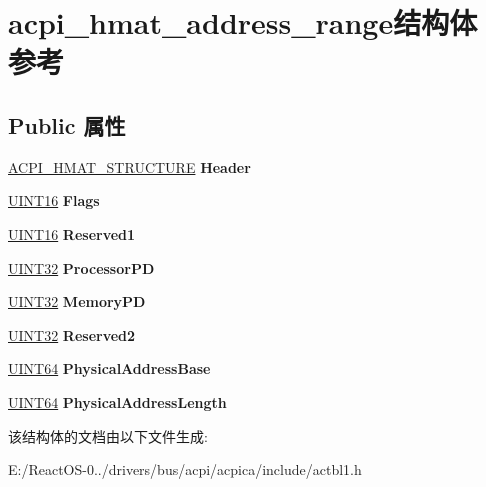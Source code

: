 \hypertarget{structacpi__hmat__address__range}{}\section{acpi\+\_\+hmat\+\_\+address\+\_\+range结构体 参考}
\label{structacpi__hmat__address__range}
\subsection*{Public 属性}
\begin{DoxyCompactItemize}
\item 
\mbox{\label{structacpi__hmat__address__range_ade450cdb46aeb62cbd66ee703dfc2ee3}} 
\hyperlink{structacpi__hmat__structure}{A\+C\+P\+I\+\_\+\+H\+M\+A\+T\+\_\+\+S\+T\+R\+U\+C\+T\+U\+RE} {\bfseries Header}
\item 
\mbox{\label{structacpi__hmat__address__range_a38cce1bba5f9caa1f22ec282641f3fa7}} 
\hyperlink{_processor_bind_8h_a09f1a1fb2293e33483cc8d44aefb1eb1}{U\+I\+N\+T16} {\bfseries Flags}
\item 
\mbox{\label{structacpi__hmat__address__range_a13a26993b37912dc9bd79932957e7619}} 
\hyperlink{_processor_bind_8h_a09f1a1fb2293e33483cc8d44aefb1eb1}{U\+I\+N\+T16} {\bfseries Reserved1}
\item 
\mbox{\label{structacpi__hmat__address__range_a09f9fbdd298071986c94a6f06dd2c865}} 
\hyperlink{_processor_bind_8h_ae1e6edbbc26d6fbc71a90190d0266018}{U\+I\+N\+T32} {\bfseries Processor\+PD}
\item 
\mbox{\label{structacpi__hmat__address__range_a704e942690a899e3a968ff5aadfb206d}} 
\hyperlink{_processor_bind_8h_ae1e6edbbc26d6fbc71a90190d0266018}{U\+I\+N\+T32} {\bfseries Memory\+PD}
\item 
\mbox{\label{structacpi__hmat__address__range_a9955eacef04c9b85d2ac0b098ba1ae78}} 
\hyperlink{_processor_bind_8h_ae1e6edbbc26d6fbc71a90190d0266018}{U\+I\+N\+T32} {\bfseries Reserved2}
\item 
\mbox{\label{structacpi__hmat__address__range_a68dc8465934af68abc98d654f4c57b18}} 
\hyperlink{_processor_bind_8h_a57be03562867144161c1bfee95ca8f7c}{U\+I\+N\+T64} {\bfseries Physical\+Address\+Base}
\item 
\mbox{\label{structacpi__hmat__address__range_ae7985969733b4951e8d9d6351122ee5c}} 
\hyperlink{_processor_bind_8h_a57be03562867144161c1bfee95ca8f7c}{U\+I\+N\+T64} {\bfseries Physical\+Address\+Length}
\end{DoxyCompactItemize}


该结构体的文档由以下文件生成\+:\begin{DoxyCompactItemize}
\item 
E\+:/\+React\+O\+S-\/0../drivers/bus/acpi/acpica/include/actbl1.\+h\end{DoxyCompactItemize}
